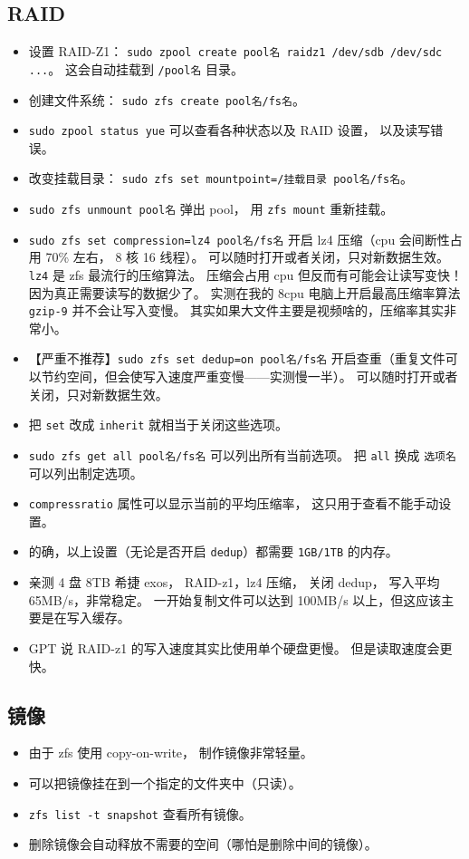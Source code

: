 \subsection{RAID}
\begin{itemize}
\item 设置 RAID-Z1： \verb|sudo zpool create pool名 raidz1 /dev/sdb /dev/sdc ...|。 这会自动挂载到 \verb|/pool名| 目录。
\item 创建文件系统： \verb|sudo zfs create pool名/fs名|。
\item \verb|sudo zpool status yue| 可以查看各种状态以及 RAID 设置， 以及读写错误。
\item 改变挂载目录： \verb|sudo zfs set mountpoint=/挂载目录 pool名/fs名|。
\item \verb|sudo zfs unmount pool名| 弹出 pool， 用 \verb|zfs mount| 重新挂载。
\item \verb|sudo zfs set compression=lz4 pool名/fs名| 开启 lz4 压缩（cpu 会间断性占用 70\% 左右， 8 核 16 线程）。 可以随时打开或者关闭，只对新数据生效。 \verb|lz4| 是 zfs 最流行的压缩算法。 压缩会占用 cpu 但反而有可能会让读写变快！ 因为真正需要读写的数据少了。 实测在我的 8cpu 电脑上开启最高压缩率算法 \verb|gzip-9| 并不会让写入变慢。 其实如果大文件主要是视频啥的，压缩率其实非常小。
\item 【严重不推荐】\verb|sudo zfs set dedup=on pool名/fs名| 开启查重（重复文件可以节约空间，但会使写入速度严重变慢——实测慢一半）。 可以随时打开或者关闭，只对新数据生效。
\item 把 \verb|set| 改成 \verb|inherit| 就相当于关闭这些选项。
\item \verb|sudo zfs get all pool名/fs名| 可以列出所有当前选项。 把 \verb|all| 换成 \verb|选项名| 可以列出制定选项。
\item \verb|compressratio| 属性可以显示当前的平均压缩率， 这只用于查看不能手动设置。
\item 的确，以上设置（无论是否开启 \verb|dedup|）都需要 \verb|1GB/1TB| 的内存。
\item 亲测 4 盘 8TB 希捷 exos， RAID-z1，lz4 压缩， 关闭 dedup， 写入平均 65MB/s，非常稳定。 一开始复制文件可以达到 100MB/s 以上，但这应该主要是在写入缓存。
\item GPT 说 RAID-z1 的写入速度其实比使用单个硬盘更慢。 但是读取速度会更快。
\end{itemize}

\subsection{镜像}
\begin{itemize}
\item 由于 zfs 使用 copy-on-write， 制作镜像非常轻量。
\item 可以把镜像挂在到一个指定的文件夹中（只读）。
\item \verb|zfs list -t snapshot| 查看所有镜像。
\item 删除镜像会自动释放不需要的空间（哪怕是删除中间的镜像）。
\end{itemize}
